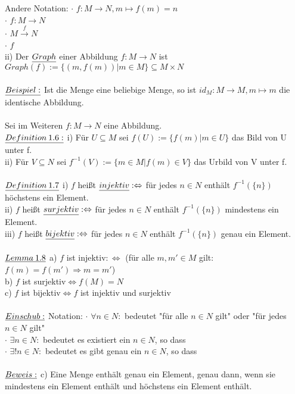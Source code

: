 \documentclass[fleqn, a4paper, 11pt]{article}
\begin{document}
Andere Notation: $\cdot$ $f:M\rightarrow N,m\mapsto f(m)=n$\\
$\cdot$ $f:M\rightarrow N$\\
$\cdot$ $M\xrightarrow{f} N$\\
$\cdot$ $f$\\
ii) Der $\uline{Graph}$ einer Abbildung $f:M\rightarrow N$ ist $Graph(f):=\{(m,f(m))|m\in M\}\subseteq M\times N$\\
\\
$\uline{Beispiel:}$ Ist die Menge eine beliebige Menge, so ist $id_{M}:M\rightarrow M,m\mapsto m$ die identische Abbildung.\\
\\
Sei im Weiteren $f:M\rightarrow N$ eine Abbildung.\\
$\uline{Definition\:1.6:}$ i) F\"ur $U\subseteq M$ sei $f(U):=\{f(m)|m\in U\}$ das Bild von U unter f.\\
ii) F\"ur $V\subseteq N$ sei $f^{-1}(V):=\{m\in M|f(m)\in V\}$ das Urbild von V unter f.\\
\\
$\uline{Definition\:1.7}$ i) $f$ hei\ss{}t $\uline{injektiv}:\Leftrightarrow$ f\"ur jedes $n\in N$ enth\"alt $f^{-1}(\{n\})$ h\"ochstens ein Element.\\
ii) $f$ hei\ss{}t $\uline{surjektiv}:\Leftrightarrow$ f\"ur jedes $n\in N$ enth\"alt $f^{-1}(\{n\})$ mindestens ein Element.\\
iii) $f$ hei\ss{}t $\uline{bijektiv}:\Leftrightarrow$ f\"ur jedes $n\in N$ enth\"alt $f^{-1}(\{n\})$ genau ein Element.\\
\\
$\uline{Lemma\:1.8}$ a) $f$ ist injektiv$:\Leftrightarrow$ (f\"ur alle $m,m'\in M$ gilt: $f(m)=f(m')\Rightarrow m=m'$)\\
b) $f$ ist surjektiv$\Leftrightarrow f(M)=N$\\
c) $f$ ist bijektiv$\Leftrightarrow f$ ist injektiv und surjektiv\\
\\
$\uline{Einschub:}$ Notation: $\cdot$ $\forall n\in N:$ bedeutet "f\"ur alle $n\in N$ gilt" oder "f\"ur jedes $n\in N$ gilt"\\
$\cdot$ $\exists n\in N:$ bedeutet \dq es existiert ein $n\in N$, so dass\dq\\
$\cdot$ $\exists!n\in N:$ bedeutet \dq es gibt genau ein $n\in N$, so dass\dq\\
\\
$\uline{Beweis:}$ c) Eine Menge enth\"alt genau ein Element, genau dann, wenn sie mindestens ein Element enth\"alt und h\"ochstens ein Element enth\"alt.\\
\end{document}
